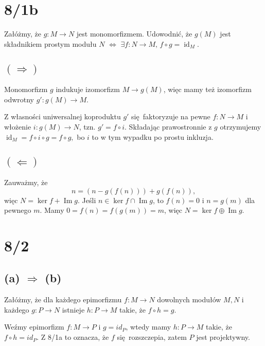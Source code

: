 \documentclass[a4paper, 12pt]{article}
\title{}
\author{Wiktor Kuchta}
\date{\vspace{-4ex}}
\DeclareMathOperator{\im}{Im}
\DeclareMathOperator{\id}{id}
\newcommand{\+}{\enspace}
\begin{document}
\maketitle

\section*{8/1b}
Załóżmy, że $g: M → N$ jest monomorfizmem.
Udowodnić, że $g(M)$ jest składnikiem prostym modułu $N$
$⇔$
$∃f: N → M,\, f∘g = \id_M$.

\subsection*{$(⇒)$}
Monomorfizm $g$ indukuje izomorfizm $M → g(M)$,
więc mamy też izomorfizm odwrotny $g': g(M) → M$.

Z własności uniwersalnej koproduktu
$g'$ się faktoryzuje na pewne $f: N → M$ i włożenie $i: g(M) → N$, tzn.
$g' = f ∘ i$.
Składając prawostronnie z $g$ otrzymujemy
$\id_M = f ∘ i ∘ g = f ∘ g,$
bo $i$ to w tym wypadku po prostu inkluzja.

\subsection*{$(⇐)$}
Zauważmy, że
$$n = (n - g(f(n))) + g(f(n)),$$
więc $N = \ker f + \im g$.
Jeśli $n ∈ \ker f ∩ \im g$, to $f(n) = 0$ i $n = g(m)$ dla pewnego $m$.
Mamy $0 = f(n) = f(g(m)) = m$, więc $N = \ker f ⊕ \im g$.

\section*{8/2}

\subsection*{(a) $⇒$ (b)}

Załóżmy, że dla każdego epimorfizmu $f: M → N$ dowolnych modułów
$M, N$ i każdego $g: P → N$ istnieje $h: P → M$ takie, że $f ∘ h = g$.

Weźmy epimorfizm $f: M → P$ i $g = id_P$,
wtedy mamy $h: P → M$ takie, że $f ∘ h = id_P$.
Z 8/1a to oznacza, że $f$ się rozszczepia, zatem $P$ jest projektywny.
\end{document}
